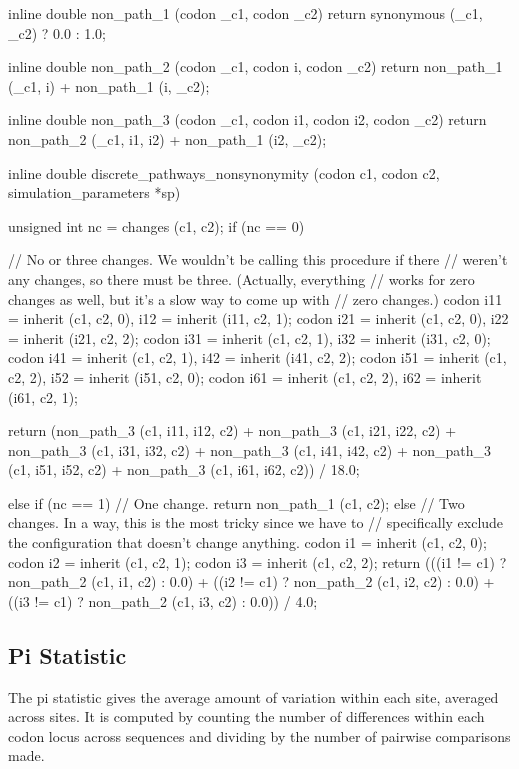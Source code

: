 \documentclass{article}
\begin{document}
\begin{ccode}
inline double non_path_1 (codon _c1, codon _c2)
  {return synonymous (_c1, _c2) ? 0.0 : 1.0;}

inline double non_path_2 (codon _c1, codon i, codon _c2)
  {return non_path_1 (_c1, i) + non_path_1 (i, _c2);}

inline double non_path_3 (codon _c1, codon i1, codon i2, codon _c2)
  {return non_path_2 (_c1, i1, i2) + non_path_1 (i2, _c2);}

inline double discrete_pathways_nonsynonymity (codon c1, codon c2, simulation_parameters *sp) {
  unsigned int nc = changes (c1, c2);
  if (nc == 0) {
    // No or three changes. We wouldn't be calling this procedure if there
    // weren't any changes, so there must be three. (Actually, everything
    // works for zero changes as well, but it's a slow way to come up with
    // zero changes.)
    codon i11 = inherit (c1, c2, 0), i12 = inherit (i11, c2, 1);
    codon i21 = inherit (c1, c2, 0), i22 = inherit (i21, c2, 2);
    codon i31 = inherit (c1, c2, 1), i32 = inherit (i31, c2, 0);
    codon i41 = inherit (c1, c2, 1), i42 = inherit (i41, c2, 2);
    codon i51 = inherit (c1, c2, 2), i52 = inherit (i51, c2, 0);
    codon i61 = inherit (c1, c2, 2), i62 = inherit (i61, c2, 1);

    return (non_path_3 (c1, i11, i12, c2) + non_path_3 (c1, i21, i22, c2) +
	    non_path_3 (c1, i31, i32, c2) + non_path_3 (c1, i41, i42, c2) +
	    non_path_3 (c1, i51, i52, c2) + non_path_3 (c1, i61, i62, c2)) / 18.0;
  } else if (nc == 1)
    // One change.
    return non_path_1 (c1, c2);
  else {
    // Two changes. In a way, this is the most tricky since we have to
    // specifically exclude the configuration that doesn't change anything.
    codon i1 = inherit (c1, c2, 0);
    codon i2 = inherit (c1, c2, 1);
    codon i3 = inherit (c1, c2, 2);
    return (((i1 != c1) ? non_path_2 (c1, i1, c2) : 0.0) +
	    ((i2 != c1) ? non_path_2 (c1, i2, c2) : 0.0) +
	    ((i3 != c1) ? non_path_2 (c1, i3, c2) : 0.0)) / 4.0;
  }
}
\end{ccode}

    \subsection{Pi Statistic}
      \label{sec:pi-statistic}

      The pi statistic gives the average amount of variation within each site,
      averaged across sites. It is computed by counting the number of
      differences within each codon locus across sequences and dividing by the
      number of pairwise comparisons made.
\end{document}
